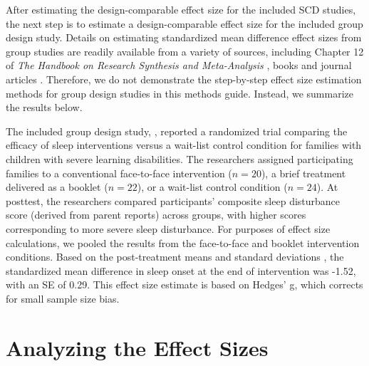 \documentclass[
]{book}
\begin{document}
After estimating the design-comparable effect size for the included SCD studies, the next step is to estimate a design-comparable effect size for the included group design study. Details on estimating standardized mean difference effect sizes from group studies are readily available from a variety of sources, including Chapter 12 of \emph{The Handbook on Research Synthesis and Meta-Analysis} \citep{Borenstein2019effect}, books \citep[e.g.,][]{borenstein2021introduction} and journal articles \citep[e.g.,][]{Hedges1981distribution, Hedges2007effect}. Therefore, we do not demonstrate the step-by-step effect size estimation methods for group design studies in this methods guide. Instead, we summarize the results below.

The included group design study, \citet{montgomery2004relative}, reported a randomized trial comparing the efficacy of sleep interventions versus a wait-list control condition for families with children with severe learning disabilities. The researchers assigned participating families to a conventional face-to-face intervention (\(n = 20\)), a brief treatment delivered as a booklet (\(n = 22\)), or a wait-list control condition (\(n = 24\)). At posttest, the researchers compared participants' composite sleep disturbance score (derived from parent reports) across groups, with higher scores corresponding to more severe sleep disturbance. For purposes of effect size calculations, we pooled the results from the face-to-face and booklet intervention conditions. Based on the post-treatment means and standard deviations \citep[Table 1]{montgomery2004relative}, the standardized mean difference in sleep onset at the end of intervention was -1.52, with an SE of 0.29. This effect size estimate is based on Hedges' g, which corrects for small sample size bias.

\hypertarget{analyzing-the-effect-sizes-1}{%
\section{Analyzing the Effect Sizes}\label{analyzing-the-effect-sizes-1}}
\end{document}

